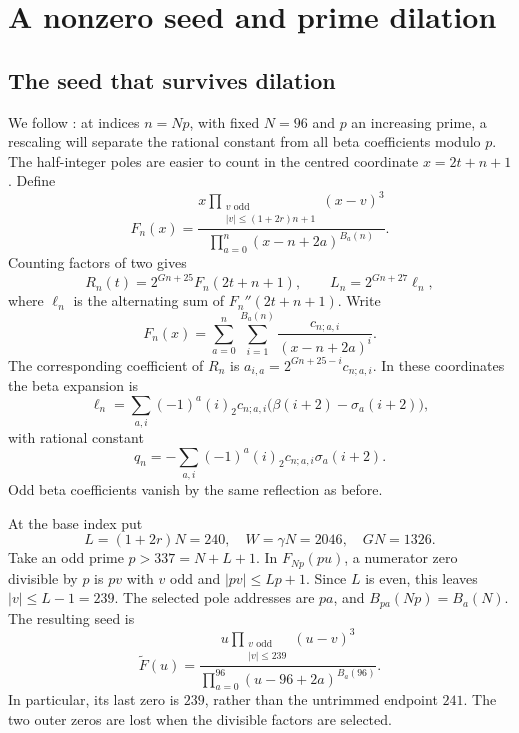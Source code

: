 \section{A nonzero seed and prime dilation}\label{sec:nonvanishing}
\subsection{The seed that survives dilation}
We follow \cite[Section 4]{powered}: at indices $n=Np$, with fixed
$N=96$ and $p$ an increasing prime, a rescaling will separate the
rational constant from all beta coefficients modulo $p$.
The half-integer poles are easier to count in the centred coordinate
$x=2t+n+1$. Define
\[
 F_n(x)=\frac{x\prod_{\substack{v\text{ odd}\\|v|\le(1+2r)n+1}}(x-v)^3}
                  {\prod_{a=0}^{n}(x-n+2a)^{B_a(n)}}.
\]
Counting factors of two gives
\begin{equation}\label{eq:coordinate-change}
 R_n(t)=2^{Gn+25}F_n(2t+n+1),\qquad
 L_n=2^{Gn+27}\ell_n,
\end{equation}
where $\ell_n$ is the alternating sum of $F_n''(2t+n+1)$.
Write
\[
 F_n(x)=\sum_{a=0}^{n}\sum_{i=1}^{B_a(n)}
                      \frac{c_{n;a,i}}{(x-n+2a)^i}.
\]
The corresponding coefficient of $R_n$ is
$a_{i,a}=2^{Gn+25-i}c_{n;a,i}$. In these coordinates the beta expansion is
\begin{equation}
 \ell_n=\sum_{a,i}(-1)^a(i)_2c_{n;a,i}
                          \bigl(\beta(i+2)-\sigma_a(i+2)\bigr),
                                                       \label{eq:ell}
\end{equation}
with rational constant
\begin{equation}
 q_n=-\sum_{a,i}(-1)^a(i)_2c_{n;a,i}\sigma_a(i+2).       \label{eq:q}
\end{equation}
Odd beta coefficients vanish by the same
reflection as before.

At the base index put
\begin{equation}\label{eq:seed-parameters}
 L=(1+2r)N=240,\quad W=\gamma N=2046,\quad GN=1326.
\end{equation}
Take an odd prime $p>337=N+L+1$. In $F_{Np}(pu)$, a numerator
zero divisible by $p$ is $pv$ with $v$ odd and $|pv|\le Lp+1$.
Since $L$ is even, this leaves $|v|\le L-1=239$. The selected pole
addresses are $pa$, and $B_{pa}(Np)=B_a(N)$. The resulting seed is
\begin{equation}\label{eq:seed}
 \widetilde F(u)=
 \frac{u\prod_{\substack{v\text{ odd}\\|v|\le239}}(u-v)^3}
      {\prod_{a=0}^{96}(u-96+2a)^{B_a(96)}}.
\end{equation}
In particular, its last zero is $239$, rather than the untrimmed
endpoint $241$. The two outer zeros are lost when the divisible
factors are selected.

